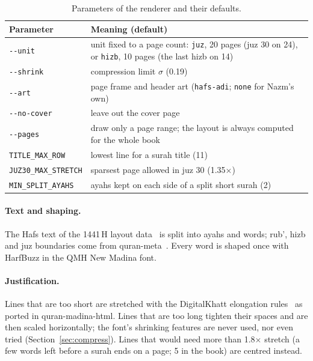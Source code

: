 \documentclass[sigconf,nonacm]{acmart}
\newcommand{\x}{\ensuremath{\times}}
\begin{document}
\begin{table}[t]
  \centering\small
  \caption{Parameters of the renderer and their defaults.}
  \label{tab:params}
  \begin{tabularx}{\linewidth}{@{}lX@{}}
    \toprule
    Parameter & Meaning (default) \\
    \midrule
    \texttt{-{}-unit} & unit fixed to a page count: \texttt{juz}, 20 pages (juz 30 on 24), or \texttt{hizb}, 10 pages (the last hizb on 14) \\
    \texttt{-{}-shrink} & compression limit $\sigma$ (0.19) \\
    \texttt{-{}-art} & page frame and header art (\texttt{hafs-adi}; \texttt{none} for Nazm's own) \\
    \texttt{-{}-no-cover} & leave out the cover page \\
    \texttt{-{}-pages} & draw only a page range; the layout is always computed for the whole book \\
    \texttt{TITLE\_MAX\_ROW} & lowest line for a surah title (11) \\
    \texttt{JUZ30\_MAX\_STRETCH} & sparsest page allowed in juz 30 (1.35\x) \\
    \texttt{MIN\_SPLIT\_AYAHS} & ayahs kept on each side of a split short surah (2) \\
    \bottomrule
  \end{tabularx}
\end{table}

\paragraph{Text and shaping.} The Hafs text of the 1441\,H layout data~\cite{qmh,tanzil} is split into ayahs and words; rub', hizb and juz boundaries come from quran-meta~\cite{quranmeta}. Every word is shaped once with HarfBuzz in the QMH New Madina font.

\paragraph{Justification.} Lines that are too short are stretched with the DigitalKhatt elongation rules~\cite{anane2021} as ported in quran-madina-html. Lines that are too long tighten their spaces and are then scaled horizontally; the font's shrinking features are never used, nor even tried (Section~\ref{sec:compress}). Lines that would need more than 1.8\x{} stretch (a few words left before a surah ends on a page; 5 in the book) are centred instead.
\end{document}
